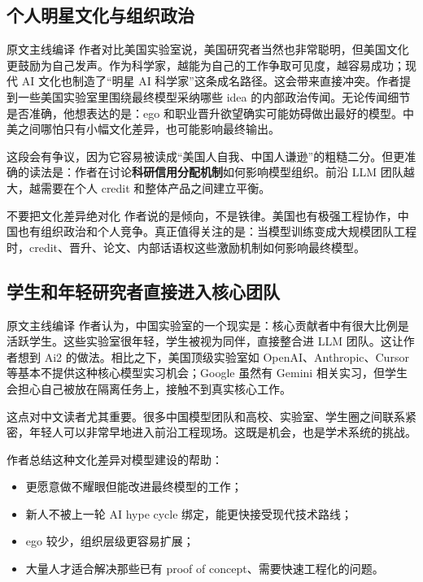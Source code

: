 \subsection{个人明星文化与组织政治}

\begin{translationbox}{原文主线编译}
作者对比美国实验室说，美国研究者当然也非常聪明，但美国文化更鼓励为自己发声。作为科学家，越能为自己的工作争取可见度，越容易成功；现代 AI 文化也制造了``明星 AI 科学家''这条成名路径。这会带来直接冲突。作者提到一些美国实验室里围绕最终模型采纳哪些 idea 的内部政治传闻。无论传闻细节是否准确，他想表达的是：ego 和职业晋升欲望确实可能妨碍做出最好的模型。中美之间哪怕只有小幅文化差异，也可能影响最终输出。
\end{translationbox}

这段会有争议，因为它容易被读成``美国人自我、中国人谦逊''的粗糙二分。但更准确的读法是：作者在讨论\textbf{科研信用分配机制}如何影响模型组织。前沿 LLM 团队越大，越需要在个人 credit 和整体产品之间建立平衡。

\begin{warningbox}{不要把文化差异绝对化}
作者说的是倾向，不是铁律。美国也有极强工程协作，中国也有组织政治和个人竞争。真正值得关注的是：当模型训练变成大规模团队工程时，credit、晋升、论文、内部话语权这些激励机制如何影响最终模型。
\end{warningbox}

\subsection{学生和年轻研究者直接进入核心团队}

\begin{translationbox}{原文主线编译}
作者认为，中国实验室的一个现实是：核心贡献者中有很大比例是活跃学生。这些实验室很年轻，学生被视为同伴，直接整合进 LLM 团队。这让作者想到 Ai2 的做法。相比之下，美国顶级实验室如 OpenAI、Anthropic、Cursor 等基本不提供这种核心模型实习机会；Google 虽然有 Gemini 相关实习，但学生会担心自己被放在隔离任务上，接触不到真实核心工作。
\end{translationbox}

这点对中文读者尤其重要。很多中国模型团队和高校、实验室、学生圈之间联系紧密，年轻人可以非常早地进入前沿工程现场。这既是机会，也是学术系统的挑战。

作者总结这种文化差异对模型建设的帮助：

\begin{itemize}[leftmargin=1.5em]
    \item 更愿意做不耀眼但能改进最终模型的工作；
    \item 新人不被上一轮 AI hype cycle 绑定，能更快接受现代技术路线；
    \item ego 较少，组织层级更容易扩展；
    \item 大量人才适合解决那些已有 proof of concept、需要快速工程化的问题。
\end{itemize}


